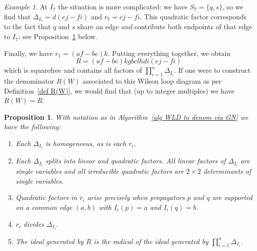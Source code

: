 \documentclass[11pt]{article}
\newtheorem{prop}[thm]{Proposition}
\theoremstyle{remark}
\newtheorem{eg}[thm]{Example}
\theoremstyle{definition}
\begin{document}
\begin{eg}
At $I_7$ the situation is more complicated: we have $S_7 = \{q,s\}$, so we find that $\Delta_{I_7} = d(ej-fi)$ and $r_7 = ej-fi$. This quadratic factor corresponds to the fact that $q$ and $s$ share an edge {\em and} contribute both endpoints of that edge to $I_7$; see Proposition~\ref{prop alg gives rad} below.  

Finally, we have $r_1 = (af-be)k$.  Putting everything together, we obtain
\[
R = (af-be)kgbclhdi(ej-fi)
\]
which is squarefree and contains all factors of $\prod_{i=1}^{n}\Delta_{I_i}$. If one were to construct the denominator $R(W)$ associated to this Wilson loop diagram as per Definition~\ref{def R(W)}, we would find that (up to integer multiples) we have $R(W) = R$.
\end{eg}


\begin{prop}\label{prop alg gives rad}
  With notation as in Algorithm~\ref{alg WLD to denom via GN} we have the following:
  \begin{enumerate}
    \item Each $\Delta_{I_i}$ is homogeneous, as is each $r_i$.
    \item Each $\Delta_{I_i}$ splits into linear and quadratic factors.  All linear factors of  $\Delta_{I_i}$ are single variables and all irreducible quadratic factors are $2\times 2$ determinants of single variables.
    \item Quadratic factors in $r_i$ arise precisely when propagators $p$ and $q$ are supported on a common edge $(a,b)$ with $I_i(p)=a$ and $I_i(q)=b$.
    \item $r_i$ divides $\Delta_{I_i}$.
    \item The ideal generated by $R$ is the radical of the ideal generated by $\prod_{i=1}^{n}\Delta_{I_i}$.
  \end{enumerate}
\end{prop}
\end{document}
